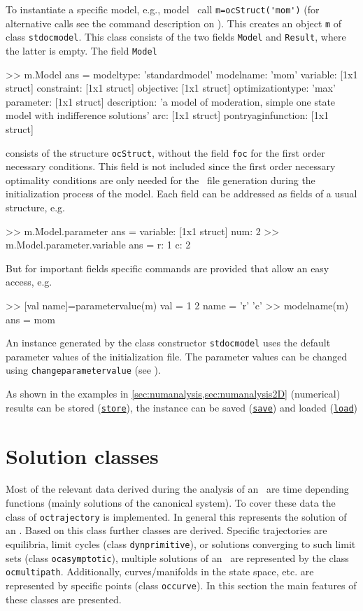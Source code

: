 To instantiate a specific model, e.g., model \MoM\, call \lstinline+m=ocStruct('mom')+ (for alternative calls see the command description on ). This creates an object \lstinline+m+ of class \lstinline+stdocmodel+. This class consists of the two fields \lstinline+Model+ and \lstinline+Result+, where the latter is empty. The field \lstinline+Model+
\begin{matlab}
>> m.Model
ans = 
             modeltype: 'standardmodel'
             modelname: 'mom'
              variable: [1x1 struct]
            constraint: [1x1 struct]
             objective: [1x1 struct]
      optimizationtype: 'max'
             parameter: [1x1 struct]
           description: {'a model of moderation, simple one state model with indifference solutions'}
                   arc: [1x1 struct]
    pontryaginfunction: [1x1 struct]
\end{matlab}
consists of the structure \lstinline+ocStruct+, without the field \lstinline+foc+ for the first order necessary conditions. This field is not included since the first order necessary optimality conditions are only needed for the \MATL\ file generation during the initialization process of the model. Each field can be addressed as fields of a usual structure, e.g.
\begin{matlab}
>> m.Model.parameter
ans = 
    variable: [1x1 struct]
         num: 2
>> m.Model.parameter.variable
ans = 
    r: 1
    c: 2
\end{matlab}
But for important fields specific commands are provided that allow an easy access, e.g.
\begin{matlab}
>> [val name]=parametervalue(m)
val =
     1     2
name = 
    'r'    'c'
>> modelname(m)
ans =
mom
\end{matlab}
An instance generated by the class constructor \lstinline+stdocmodel+ uses the default parameter values of the initialization file. The parameter values can be changed using \lstinline+changeparametervalue+ (see ).

As shown in the examples in \cref{sec:numanalysis,sec:numanalysis2D} (numerical) results can be stored (\hyperref[cmd:store]{\lstinline+store+}), the instance can be saved (\hyperref[cmd:save]{\lstinline+save+}) and loaded (\hyperref[cmd:load]{\lstinline+load+})

\section{Solution classes}
Most of the relevant data derived during the analysis of an \OCPRO\ are time depending functions (mainly solutions of the canonical system). To cover these data the class of \lstinline+octrajectory+ is implemented. In general this represents the solution of an \ODE. Based on this class further classes are derived. Specific trajectories are equilibria, limit cycles (class \lstinline+dynprimitive+), or solutions converging to such limit sets (class \lstinline+ocasymptotic+), multiple solutions of an \OCPRO\ are represented by the class \lstinline+ocmultipath+. Additionally, curves/manifolds in the state space, etc. are represented by specific points (class \lstinline+occurve+). In this section the main features of these classes are presented.

